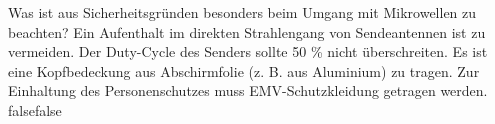     {Was ist aus Sicherheitsgründen besonders beim Umgang mit Mikrowellen zu beachten?}
    {Ein Aufenthalt im direkten Strahlengang von Sendeantennen ist zu vermeiden.}
    {Der Duty-Cycle des Senders sollte 50 \% nicht überschreiten.}
    {Es ist eine Kopfbedeckung aus Abschirmfolie (z. B. aus Aluminium) zu tragen.}
    {Zur Einhaltung des Personenschutzes muss EMV-Schutzkleidung getragen werden.}
    {false}{false}